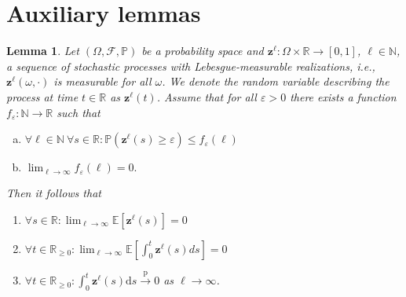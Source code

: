 \documentclass[a4paper,
               10pt,
               pdftex,
               normalheadings,
               headsepline,
               footsepline,
               headinclude,
               footinclude,
               DIV=14,
               abstracton]
{scrartcl}
\newtheorem{lemma}[theorem]{Lemma}
\newcommand{\R}{\mathbb{R}}
\newcommand{\rv}[1]{\bm{#1}}
\newcommand{\super}[1]{^{{#1}}}
\newcommand{\toprob}{\overset{\mathrm{p}}{\longrightarrow}}
\newcommand{\diff}{\mathrm{d}}
\begin{document}
\section{Auxiliary lemmas}
\begin{lemma} \label{lemma:conv_prob}
Let $(\Omega, \mathcal{F}, \mathbb{P})$ be a probability space and $\rv{z}\super{\ell}: \Omega \times \R \to [0, 1]$, $\ell \in \mathbb{N}$, a sequence of stochastic processes with Lebesgue-measurable realizations, i.e., $\rv{z}\super{\ell}(\omega, \cdot)$ is measurable for all $\omega$. We denote the random variable describing the process at time $t \in \R$ as $\rv{z}\super{\ell}(t)$.
Assume that for all $\varepsilon > 0$ there exists a function $f_\varepsilon:\mathbb{N} \to \R$ such that
\begin{enumerate}[a)]
    \item $\forall \ell \in \mathbb{N} \ \forall s \in \R: \mathbb{P}(\rv{z}\super{\ell}(s) \geq \varepsilon) \leq f_\varepsilon(\ell)$
    \item $\lim_{\ell \to \infty} f_\varepsilon(\ell) = 0.$
\end{enumerate}
Then it follows that
\begin{enumerate}[1)]
    \item $\forall s \in \R: \lim_{\ell \to \infty} \mathbb{E}[\rv{z}\super{\ell}(s)] = 0$
    \item $\forall t\in\R_{\geq 0}: \lim_{\ell \to \infty} \mathbb{E}[\int_0^t \rv{z}\super{\ell}(s) ds] = 0$
    \item $\forall t\in\R_{\geq 0}: \int_0^t \rv{z}\super{\ell}(s) \diff s \toprob 0$ as $\ell \to \infty$.
\end{enumerate}
\end{lemma}
\end{document}
